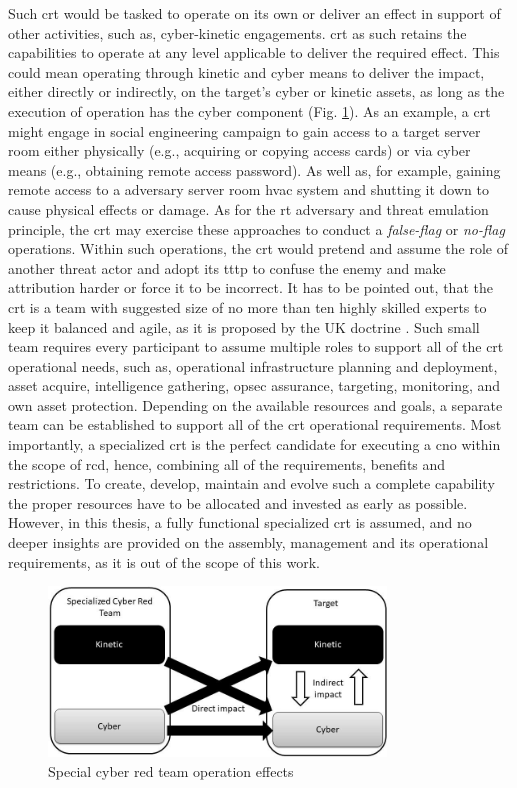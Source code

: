 Such \gls{crt} would be tasked to operate on its own or deliver an effect in support of other activities, such as, cyber-kinetic engagements.
\gls{crt} as such retains the capabilities to operate at any level applicable to deliver the required effect. This could mean operating through kinetic and cyber means to deliver the impact, either directly or indirectly, on the target's cyber or kinetic assets, as long as the execution of operation has the cyber component (Fig. \ref{fig:crt}). As an example, a \gls{crt} might engage in social engineering campaign to gain access to a target server room either physically (e.g., acquiring or copying access cards) or via cyber means (e.g., obtaining remote access password). As well as, for example, gaining remote access to a adversary server room \gls{hvac} system and shutting it down to cause physical effects or damage.
As for the \gls{rt} adversary and threat emulation principle, the \gls{crt} may exercise these approaches to conduct a \textit{false-flag} or \textit{no-flag} operations. Within such operations, the \gls{crt} would pretend and assume the role of another threat actor and adopt its \gls{tttp} to confuse the enemy and make attribution harder or force it to be incorrect.
It has to be pointed out, that the \gls{crt} is a team with suggested size of no more than ten highly skilled experts to keep it balanced and agile, as it is proposed by the UK doctrine \cite{UK2013}. Such small team requires every participant to assume multiple roles to support all of the \gls{crt} operational needs, such as, operational infrastructure planning and deployment, asset acquire, intelligence gathering, \gls{opsec} assurance, targeting, monitoring, and own asset protection. Depending on the available resources and goals, a separate team can be established to support all of the \gls{crt} operational requirements.
Most importantly, a specialized \gls{crt} is the perfect candidate for executing a \gls{cno} within the scope of \gls{rcd}, hence, combining all of the requirements, benefits and restrictions. To create, develop, maintain and evolve such a complete capability the proper resources have to be allocated and invested as early as possible. However, in this thesis, a fully functional specialized \gls{crt} is assumed, and no deeper insights are provided on the assembly, management and its operational requirements, as it is out of the scope of this work.

\begin{figure}[!htb]
    \centering
    \includegraphics[width=0.8\textwidth]{./img/scrt.jpg}
    \caption{Special cyber red team operation effects}
    \label{fig:crt}
\end{figure}

